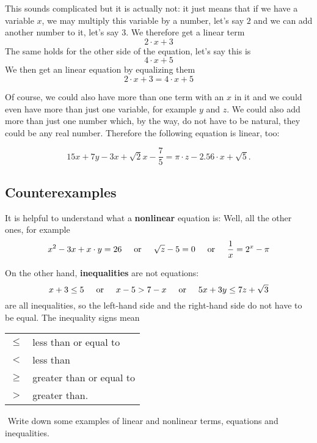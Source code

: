 \vsp

This sounds complicated but it is actually not: it just means that if we have a variable $x$, we may multiply this variable by a number, let's say $2$ and we can add another number to it, let's say $3$. We therefore get a linear term
\[
2\cdot x + 3
\]
The same holds for the other side of the equation, let's say this is 
\[
4\cdot x + 5
\]
We then get an linear equation by equalizing them
\[
2\cdot x + 3=4\cdot x + 5
\]

Of course, we could also have more than one term with an $x$ in it and we could even have more than just one variable, for example $y$ and $z$. We could also add more than just one number which, by the way, do not have to be natural, they could be any real number. Therefore the following equation is linear, too:

\[
15x + 7y - 3x + \sqrt{2}x - \frac{7}{5} = \pi \cdot z - 2.56\cdot x + \sqrt{5}.
\]



\vsp

\subsection*{Counterexamples}

It is helpful to understand what a \textbf{nonlinear} equation is: Well, all the other ones, for example
\[
x^2-3x +x\cdot y= 26 \hspace{5mm} \text{or} \hspace{5mm} \sqrt{z}-5=0 \hspace{5mm} \text{or} \hspace{5mm} \frac{1}{x} = 2^x-\pi
\]

On the other hand, \textbf{inequalities} are not equations:
\[
x+3\leq 5 \hspace{5mm} \text{or} \hspace{5mm} x-5>7-x \hspace{5mm} \text{or} \hspace{5mm}5x+3y\leq 7z+\sqrt{3}
\]
are all inequalities, so the left-hand side and the right-hand side do not have to be equal. The inequality signs mean

\begin{center}
\begin{tabular}{rl}
$\leq$ & less than or equal to\\
$<$ & less than \\
$\geq$ & greater than or equal to\\
$>$ & greater than.
\end{tabular}
\end{center}

\vsp

\begin{exer}
$ $
Write down some examples of linear and nonlinear terms, equations and inequalities. 
\end{exer}


